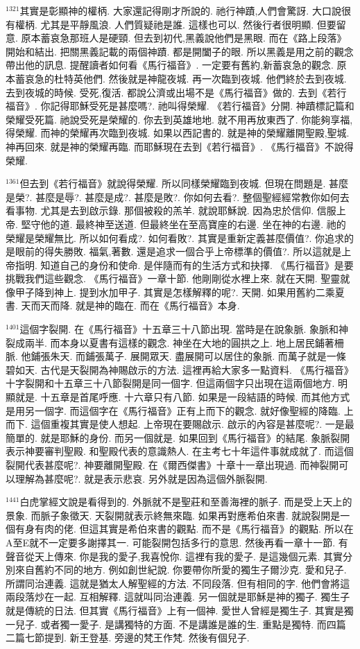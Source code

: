 \documentclass{book}
\begin{document}
$^{1321}$其實是彰顯神的權柄.
大家還記得剛才所說的.
祂行神蹟,人們會驚訝.
大口說很有權柄.
尤其是平靜風浪.
人們質疑祂是誰.
這樣也可以.
然後行者很明顯.
但要留意.
原本蓄哀急那班人是硬頸.
但去到初代,黑義說他們是黑眼.
而在《路上段落》開始和結出.
把關黑義記載的兩個神蹟.
都是開闔子的眼.
所以黑義是用之前的觀念帶出他的訊息.
提醒讀者如何看《馬行福音》.
一定要有舊約,新蓄哀急的觀念.
原本蓄哀急的杜特英他們.
然後就是神龍夜城.
再一次臨到夜城.
他們終於去到夜城.
去到夜城的時候.
受死,復活.
都說公濟或出場不是《馬行福音》做的.
去到《若行福音》.
你記得耶穌受死是甚麼嗎?.
祂叫得榮耀.
《若行福音》分開.
神蹟標記篇和榮耀受死篇.
祂說受死是榮耀的.
你去到英雄地地.
就不用再放東西了.
你能夠享福,得榮耀.
而神的榮耀再次臨到夜城.
如果以西記書的.
就是神的榮耀離開聖殿,聖城.
神再回來.
就是神的榮耀再臨.
而耶穌現在去到《若行福音》.
《馬行福音》不說得榮耀.

$^{1361}$但去到《若行福音》就說得榮耀.
所以同樣榮耀臨到夜城.
但現在問題是.
甚麼是榮?.
甚麼是辱?.
甚麼是成?.
甚麼是敗?.
你如何去看?.
整個聖經經常教你如何去看事物.
尤其是去到啟示錄.
那個被殺的羔羊.
就說耶穌說.
因為忠於信仰.
信服上帝.
堅守他的道.
最終神至送道.
但最終坐在至高寶座的右邊.
坐在神的右邊.
祂的榮耀是榮耀無比.
所以如何看成?.
如何看敗?.
其實是重新定義甚麼價值?.
你追求的是眼前的得失勝敗.
福氣,著數.
還是追求一個合乎上帝標準的價值?.
所以這就是上帝指明.
知道自己的身份和使命.
是伴隨而有的生活方式和抉擇.
《馬行福音》是要挑戰我們這些觀念.
《馬行福音》一章十節.
他剛剛從水裡上來.
就在天開.
聖靈就像甲子降到神上.
提到水加甲子.
其實是怎樣解釋的呢?.
天開.
如果用舊約二乘夏書.
天而天而降.
就是神的臨在.
而在《馬行福音》本身.

$^{1401}$這個字裂開.
在《馬行福音》十五章三十八節出現.
當時是在說象脈.
象脈和神裂成兩半.
而本身以夏書有這樣的觀念.
神坐在大地的圓拱之上.
地上居民鋪著柵脈.
他鋪張朱天.
而鋪張萬子.
展開眾天.
盡展開可以居住的象脈.
而萬子就是一條碧如天.
古代是天裂開為神賜啟示的方法.
這裡再給大家多一點資料.
《馬行福音》十字裂開和十五章三十八節裂開是同一個字.
但這兩個字只出現在這兩個地方.
明顯就是.
十五章是首尾呼應.
十六章只有八節.
如果是一段結語的時候.
而其他方式是用另一個字.
而這個字在《馬行福音》正有上而下的觀念.
就好像聖經的降臨.
上而下.
這個重複其實是使人想起.
上帝現在要賜啟示.
啟示的內容是甚麼呢?.
一是最簡單的.
就是耶穌的身份.
而另一個就是.
如果回到《馬行福音》的結尾.
象脈裂開表示神要審判聖殿.
和聖殿代表的意識熱人.
在主考七十年這件事就成就了.
而這個裂開代表甚麼呢?.
神要離開聖殿.
在《爾西傑書》十章十一章出現過.
而神裂開可以理解為甚麼呢?.
就是表示悲哀.
另外就是因為這個外脈裂開.

$^{1441}$白虎掌經文說是看得到的.
外脈就不是聖莊和至善海裡的脈子.
而是受上天上的景象.
而脈子象徵天.
天裂開就表示終無來臨.
如果再對應希伯來書.
就說裂開是一個有身有肉的佬.
但這其實是希伯來書的觀點.
而不是《馬行福音》的觀點.
所以在A至E就不一定要多謝擇其一.
可能裂開包括多行的意思.
然後再看一章十一節.
有聲音從天上傳來.
你是我的愛子,我喜悅你.
這裡有我的愛子.
是這幾個元素.
其實分別來自舊約不同的地方.
例如創世紀說.
你要帶你所愛的獨生子爾沙克.
愛和兒子.
所謂同治連義.
這就是猶太人解聖經的方法.
不同段落.
但有相同的字.
他們會將這兩段落炒在一起.
互相解釋.
這就叫同治連義.
另一個就是耶穌是神的獨子.
獨生子就是傳統的日法.
但其實《馬行福音》上有一個神.
愛世人曾經是獨生子.
其實是獨一兒子.
或者獨一愛子.
是講獨特的方面.
不是講誰是誰的生.
重點是獨特.
而四篇二篇七節提到.
新王登基.
旁邊的梵王作梵.
然後有個兒子.
\end{document}
